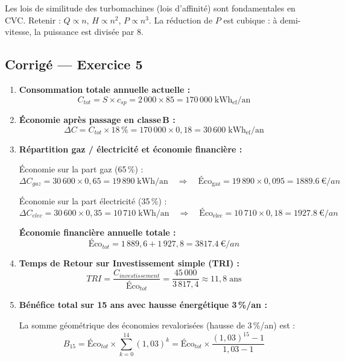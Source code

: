 \begin{methode}
Les lois de similitude des turbomachines (lois d'affinité) sont fondamentales en CVC. Retenir : $Q \propto n$, $H \propto n^2$, $P \propto n^3$. La réduction de $P$ est cubique : à demi-vitesse, la puissance est divisée par 8.
\end{methode}

\subsection*{Corrigé — Exercice 5}

\begin{enumerate}
  \item \textbf{Consommation totale annuelle actuelle :}
  \[
    C_{tot} = S \times c_{sp} = 2\,000 \times 85 = \boxed{170\,000\;\text{kWh}_\text{ef}/\text{an}}
  \]

  \item \textbf{Économie après passage en classe\,B :}
  \[
    \Delta C = C_{tot} \times 18\,\% = 170\,000 \times 0{,}18 = \boxed{30\,600\;\text{kWh}_\text{ef}/\text{an}}
  \]

  \item \textbf{Répartition gaz / électricité et économie financière :}

  Économie sur la part gaz (65\,\%) :
  \[
    \Delta C_{gaz} = 30\,600 \times 0{,}65 = 19\,890\;\text{kWh/an}
    \quad\Rightarrow\quad
    \text{Éco}_{\text{gaz}} = 19\,890 \times 0{,}095 = \SI{1889.6}{\euro/an}
  \]

  Économie sur la part électricité (35\,\%) :
  \[
    \Delta C_{elec} = 30\,600 \times 0{,}35 = 10\,710\;\text{kWh/an}
    \quad\Rightarrow\quad
    \text{Éco}_{\text{elec}} = 10\,710 \times 0{,}18 = \SI{1927.8}{\euro/an}
  \]

  \textbf{Économie financière annuelle totale :}
  \[
    \text{Éco}_{tot} = 1\,889{,}6 + 1\,927{,}8 = \boxed{\SI{3817.4}{\euro/an}}
  \]

  \item \textbf{Temps de Retour sur Investissement simple (TRI) :}
  \[
    TRI = \frac{C_{investissement}}{\text{Éco}_{tot}} = \frac{45\,000}{3\,817{,}4} \approx \boxed{11{,}8\;\text{ans}}
  \]

  \item \textbf{Bénéfice total sur 15 ans avec hausse énergétique 3\,\%/an :}

  La somme géométrique des économies revalorisées (hausse de 3\,\%/an) est :
  \[
    B_{15} = \text{Éco}_{tot} \times \sum_{k=0}^{14}(1{,}03)^k
           = \text{Éco}_{tot} \times \frac{(1{,}03)^{15} - 1}{1{,}03 - 1}
  \]


\end{enumerate}
